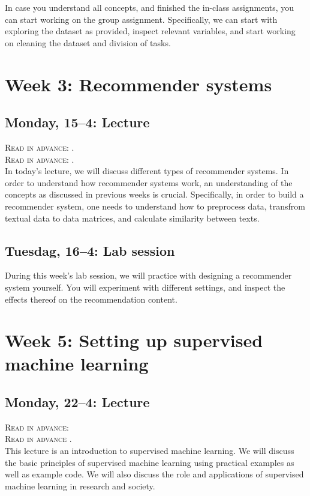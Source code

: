 In case you understand all concepts, and finished the in-class assignments, you can start working on the group assignment.  Specifically, we can start with exploring the dataset as provided, inspect relevant variables, and start working on cleaning the dataset and division of tasks. 

\section*{Week 3: Recommender systems}

\subsection*{Monday, 15--4: Lecture}
\textsc{ Read in advance: \cite{Moller2018}.}\\
\textsc{ Read in advance: \cite{Loecherbach2020}.}\\

In today's lecture, we will discuss different types of recommender systems. In order to understand how recommender systems work, an understanding of the concepts as discussed in previous weeks is crucial. Specifically, in order to build a recommender system, one needs to understand how to preprocess data, transfrom textual data to data matrices, and calculate similarity between texts. 

\subsection*{Tuesdag, 16--4: Lab session}
During this week's lab session, we will practice with designing a recommender system yourself. You will experiment with different settings, and inspect the effects thereof on the recommendation content. 

\section*{Week 5: Setting up supervised machine learning}

\subsection*{Monday, 22--4: Lecture}
\textsc{ Read in advance: \cite{vermeer_seeing_2019}}\\
\textsc{ Read in advance \cite{meppelink_reliable_2021}.}\\

This lecture is an introduction to supervised machine learning. We will discuss the basic principles of supervised machine learning using practical examples as well as example code. We will also discuss the role and applications of supervised machine learning in research and society.


